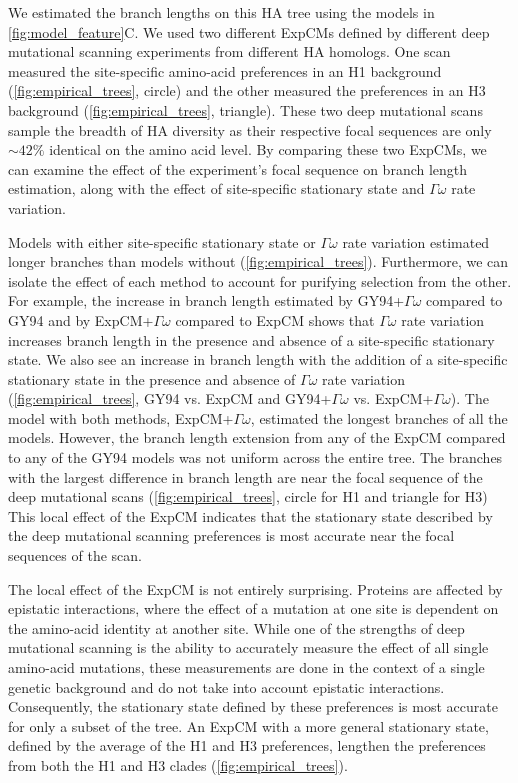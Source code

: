 \documentclass[11pt]{article}
\begin{document}
We estimated the branch lengths on this HA tree using the models in \ref{fig:model_feature}C. 
We used two different ExpCMs defined by different deep mutational scanning experiments from different HA homologs. 
One scan measured the site-specific amino-acid preferences in an H1 background (\ref{fig:empirical_trees}, circle) and the other measured the preferences in an H3 background (\ref{fig:empirical_trees}, triangle). 
These two deep mutational scans sample the breadth of HA diversity as their respective focal sequences are only $\sim42\%$ identical on the amino acid level. 
By comparing these two ExpCMs, we can examine the effect of the experiment's focal sequence on branch length estimation, along with the effect of site-specific stationary state and $\Gamma\omega$ rate variation.

Models with either site-specific stationary state or $\Gamma\omega$ rate variation estimated longer branches than models without (\ref{fig:empirical_trees}). 
Furthermore, we can isolate the effect of each method to account for purifying selection from the other. 
For example, the increase in branch length estimated by GY94+$\Gamma\omega$ compared to GY94 and by ExpCM+$\Gamma\omega$ compared to ExpCM shows that $\Gamma\omega$ rate variation increases branch length in the presence and absence of a site-specific stationary state. 
We also see an increase in branch length with the addition of a site-specific stationary state in the presence and absence of $\Gamma\omega$ rate variation (\ref{fig:empirical_trees}, GY94 vs. ExpCM and GY94+$\Gamma\omega$ vs. ExpCM+$\Gamma\omega$). 
The model with both methods, ExpCM+$\Gamma\omega$, estimated the longest branches of all the models. 
However, the branch length extension from any of the ExpCM compared to any of the GY94 models was not uniform across the entire tree. 
The branches with the largest difference in branch length are near the focal sequence of the deep mutational scans (\ref{fig:empirical_trees}, circle for H1 and triangle for H3)
This local effect of the ExpCM indicates that the stationary state described by the deep mutational scanning preferences is most accurate near the focal sequences of the scan. 

The local effect of the ExpCM is not entirely surprising. 
Proteins are affected by epistatic interactions, where the effect of a mutation at one site is dependent on the amino-acid identity at another site. 
While one of the strengths of deep mutational scanning is the ability to accurately measure the effect of all single amino-acid mutations, these measurements are done in the context of a single genetic background and do not take into account epistatic interactions. 
Consequently, the stationary state defined by these preferences is most accurate for only a subset of the tree.
An ExpCM with a more general stationary state, defined by the average of the H1 and H3 preferences, lengthen the preferences from both the H1 and H3 clades (\ref{fig:empirical_trees}). 
\end{document}
